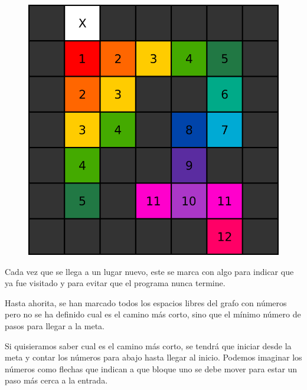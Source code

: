 \documentclass{article}
\begin{document}
\begin{figure}[H]
    \centering
    \includegraphics[width=0.3\paperwidth]{bfs}
\end{figure}

Cada vez que se llega a un lugar nuevo, este se marca con algo para indicar que ya fue visitado y para evitar que el programa nunca termine. 

Hasta ahorita, se han marcado todos los espacios libres del grafo con números pero no se ha definido cual es el camino más corto, sino que el mínimo número de pasos para llegar a la meta.

Si quisieramos saber cual es el camino más corto, se tendrá que iniciar desde la meta y contar los números para abajo hasta llegar al inicio. Podemos imaginar los números como flechas que indican a que bloque uno se debe mover para estar un paso más cerca a la entrada.
\end{document}
